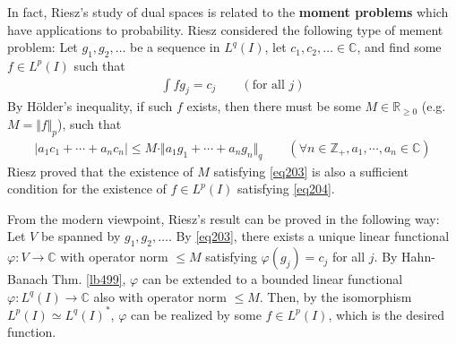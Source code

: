 \documentclass[12pt,b5paper,notitlepage]{article}
\theoremstyle{definition}
\theoremstyle{plain}
\newcommand{\Cbb}{\mathbb C}
\newcommand{\Zbb}{\mathbb Z}
\newcommand{\Rbb}{\mathbb R}
\numberwithin{equation}{section}
\begin{document}
In fact, Riesz's study of dual spaces is related to the \textbf{moment problems} which have applications to probability. Riesz considered the following type of mement problem: Let $g_1,g_2,\dots$ be a sequence in $L^q(I)$, let $c_1,c_2,\dots\in\Cbb$, and find some $f\in L^p(I)$ such that
\begin{align}
\int fg_j=c_j\qquad(\text{for all } j) \label{eq204}
\end{align}
By H\"older's inequality, if such $f$ exists, then there must be some $M\in\Rbb_{\geq0}$ (e.g. $M=\Vert f\Vert_p$), such that 
\begin{align}\label{eq203}
|a_1c_1+\cdots+a_nc_n|\leq M\cdot \Vert a_1g_1+\cdots+a_ng_n\Vert_q\qquad(\forall n\in\Zbb_+,a_1,\cdots,a_n\in\Cbb)
\end{align}
Riesz proved that the existence of $M$ satisfying \eqref{eq203} is also a sufficient condition for the existence of $f\in L^p(I)$ satisfying \eqref{eq204}. 

From the modern viewpoint, Riesz's result can be proved in the following way: Let $V$ be spanned by $g_1,g_2,\dots$. By \eqref{eq203}, there exists a unique linear functional $\varphi:V\rightarrow\Cbb$ with operator norm $\leq M$ satisfying $\varphi(g_j)=c_j$ for all $j$. By Hahn-Banach Thm. \ref{lb499}, $\varphi$ can be extended to a bounded linear functional $\varphi:L^q(I)\rightarrow\Cbb$ also with operator norm $\leq M$. Then, by the isomorphism $L^p(I)\simeq L^q(I)^*$, $\varphi$ can be realized by some $f\in L^p(I)$, which is the desired function.
\end{document}
